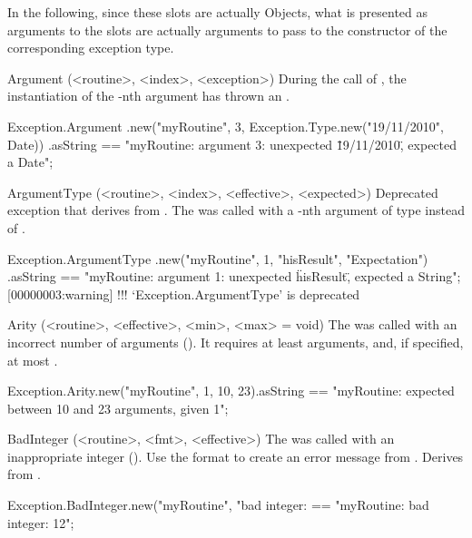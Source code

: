 In the following, since these slots are actually Objects, what is presented
as arguments to the slots are actually arguments to pass to the constructor
of the corresponding exception type.
\begin{urbiscriptapi}
\item[Argument](<routine>, <index>, <exception>)
  During the call of , the instantiation of the -nth
  argument has thrown an .
\begin{urbiassert}
Exception.Argument
  .new("myRoutine", 3, Exception.Type.new("19/11/2010", Date))
  .asString
== "myRoutine: argument 3: unexpected \"19/11/2010\", expected a Date";
\end{urbiassert}

\item[ArgumentType](<routine>, <index>, <effective>, <expected>)
  Deprecated exception that derives from .  The  was
  called with a -nth argument of type 
  instead of .
\begin{urbiassert}
Exception.ArgumentType
  .new("myRoutine", 1, "hisResult", "Expectation")
  .asString
== "myRoutine: argument 1: unexpected \"hisResult\", expected a String";
[00000003:warning] !!! `Exception.ArgumentType' is deprecated
\end{urbiassert}

\item[Arity](<routine>, <effective>, <min>, <max> = void)
  The  was called with an incorrect number of arguments
  ().  It requires at least  arguments, and,
  if specified, at most .
\begin{urbiassert}
Exception.Arity.new("myRoutine", 1, 10, 23).asString
  == "myRoutine: expected between 10 and 23 arguments, given 1";
\end{urbiassert}

\item[BadInteger](<routine>, <fmt>, <effective>)
  The  was called with an inappropriate integer
  ().  Use the format  to create an error
  message from .  Derives from
  .
\begin{urbiassert}
Exception.BadInteger.new("myRoutine", "bad integer: %
  == "myRoutine: bad integer: 12";
\end{urbiassert}


\end{urbiscriptapi}
